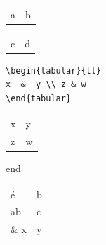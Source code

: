 \begin{tabular}{ll}
  a & b \\
\end{tabular}
\begin{tabular}{ll}
  c & d \\
\end{tabular}
\begin{verbatim}
\begin{tabular}{ll}
x  &  y \\ z & w
\end{tabular}
\end{verbatim}
\begin{tabular}{ll}
x  &  y \\ z & w
\end{tabular}
end
\begin{tabular}{ll}
  é    & b \\
  ab   & c \\
  \& x & y \\
\end{tabular}
